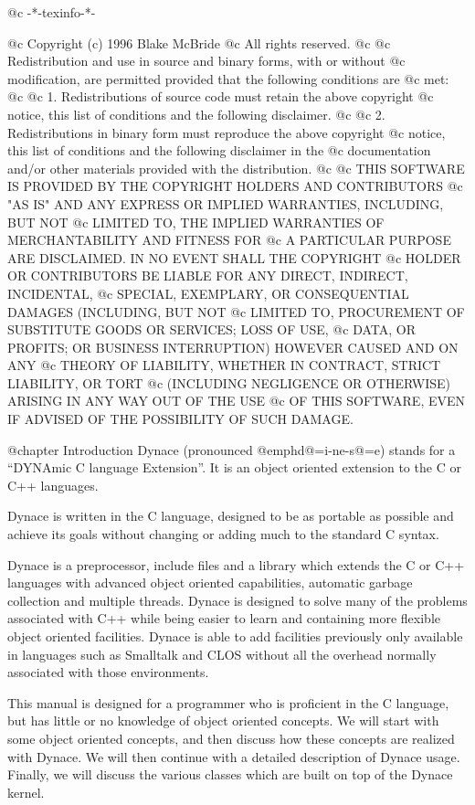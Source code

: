 @c -*-texinfo-*-

@c  Copyright (c) 1996 Blake McBride
@c  All rights reserved.
@c
@c  Redistribution and use in source and binary forms, with or without
@c  modification, are permitted provided that the following conditions are
@c  met:
@c
@c  1. Redistributions of source code must retain the above copyright
@c  notice, this list of conditions and the following disclaimer.
@c
@c  2. Redistributions in binary form must reproduce the above copyright
@c  notice, this list of conditions and the following disclaimer in the
@c  documentation and/or other materials provided with the distribution.
@c
@c  THIS SOFTWARE IS PROVIDED BY THE COPYRIGHT HOLDERS AND CONTRIBUTORS
@c  "AS IS" AND ANY EXPRESS OR IMPLIED WARRANTIES, INCLUDING, BUT NOT
@c  LIMITED TO, THE IMPLIED WARRANTIES OF MERCHANTABILITY AND FITNESS FOR
@c  A PARTICULAR PURPOSE ARE DISCLAIMED. IN NO EVENT SHALL THE COPYRIGHT
@c  HOLDER OR CONTRIBUTORS BE LIABLE FOR ANY DIRECT, INDIRECT, INCIDENTAL,
@c  SPECIAL, EXEMPLARY, OR CONSEQUENTIAL DAMAGES (INCLUDING, BUT NOT
@c  LIMITED TO, PROCUREMENT OF SUBSTITUTE GOODS OR SERVICES; LOSS OF USE,
@c  DATA, OR PROFITS; OR BUSINESS INTERRUPTION) HOWEVER CAUSED AND ON ANY
@c  THEORY OF LIABILITY, WHETHER IN CONTRACT, STRICT LIABILITY, OR TORT
@c  (INCLUDING NEGLIGENCE OR OTHERWISE) ARISING IN ANY WAY OUT OF THE USE
@c  OF THIS SOFTWARE, EVEN IF ADVISED OF THE POSSIBILITY OF SUCH DAMAGE.


@chapter Introduction
Dynace (pronounced @emph{d@=i-ne-s@=e}) stands for a ``DYNAmic C
language Extension''.  It is an object oriented extension to the C or
C++ languages.

Dynace is written in the C language, designed to be as portable as
possible and achieve its goals without changing or adding much to the
standard C syntax.

Dynace is a preprocessor, include files and a library which extends the
C or C++ languages with advanced object oriented capabilities, automatic
garbage collection and multiple threads.  Dynace is designed to solve
many of the problems associated with C++ while being easier to learn and
containing more flexible object oriented facilities.  Dynace is able to
add facilities previously only available in languages such as Smalltalk
and CLOS without all the overhead normally associated with those
environments.

This manual is designed for a programmer who is proficient in the C language,
but has little or no knowledge of object oriented concepts.  We will start
with some object oriented concepts, and then discuss how these concepts
are realized with Dynace.  We will then continue with a detailed description of
Dynace usage.  Finally, we will discuss the various classes which are built
on top of the Dynace kernel.


